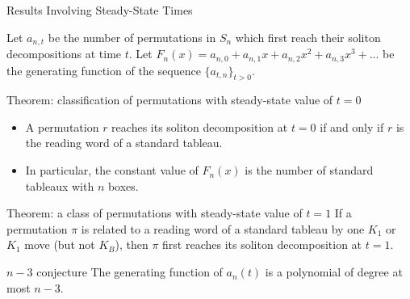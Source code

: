 \documentclass[aspectratio=169, serif]{beamer}
\begin{document}
\begin{frame}{Results Involving Steady-State Times}

    Let $a_{n,t}$ be the number of permutations in $S_n$ which first reach their soliton decompositions at  time $t$. Let $F_n(x)=a_{n,0} + a_{n,1} x + a_{n,2} x^2 + a_{n,3} x^3 + \dots $ be the generating function of the sequence $\{a_{t,n}\}_{t > 0}$.

    \begin{alertblock}{Theorem: classification of permutations with steady-state value of $t=0$}
\begin{itemize}
    \item 
   A permutation $r$ reaches its soliton decomposition at $t=0$ if and only if $r$ is the reading word of a standard tableau. 
   \item 
   In particular, the constant value of $F_n(x)$ is the number of standard tableaux with $n$ boxes. 
   \end{itemize}
    \end{alertblock}
    \begin{alertblock}{Theorem: a class of permutations with steady-state value of $t=1$}
    If a permutation $\pi$ is related to a reading word of a standard tableau by one $K_1$ or $K_1$ move (but not $K_B$), then $\pi$ first reaches its soliton decomposition at $t=1$.
    
    \end{alertblock}
    

    \begin{block}{$n-3$ conjecture}
    The generating function of $a_n(t)$ is a polynomial of degree at most $n-3$. 
    
    \end{block}
\end{frame}
\end{document}
